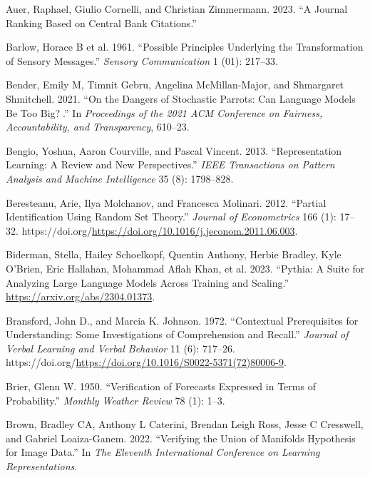 \documentclass[
]{article}
\newlength{\cslhangindent}
\newenvironment{CSLReferences}[2] %
 {\begin{list}{}{%
  \setlength{\itemindent}{0pt}
  \setlength{\leftmargin}{0pt}
  \setlength{\parsep}{0pt}
  \ifodd #1
   \setlength{\leftmargin}{\cslhangindent}
   \setlength{\itemindent}{-1\cslhangindent}
  \fi
  \setlength{\itemsep}{#2\baselineskip}}}
 {\end{list}}
\theoremstyle{plain}
\theoremstyle{definition}
\theoremstyle{remark}
\begin{document}
\begin{CSLReferences}{1}{0}
Auer, Raphael, Giulio Cornelli, and Christian Zimmermann. 2023. {``A
Journal Ranking Based on Central Bank Citations.''}

Barlow, Horace B et al. 1961. {``Possible Principles Underlying the
Transformation of Sensory Messages.''} \emph{Sensory Communication} 1
(01): 217--33.

Bender, Emily M, Timnit Gebru, Angelina McMillan-Major, and Shmargaret
Shmitchell. 2021. {``On the Dangers of Stochastic Parrots: Can Language
Models Be Too Big?🦜.''} In \emph{Proceedings of the 2021 ACM Conference
on Fairness, Accountability, and Transparency}, 610--23.

Bengio, Yoshua, Aaron Courville, and Pascal Vincent. 2013.
{``Representation Learning: A Review and New Perspectives.''} \emph{IEEE
Transactions on Pattern Analysis and Machine Intelligence} 35 (8):
1798--828.

Beresteanu, Arie, Ilya Molchanov, and Francesca Molinari. 2012.
{``Partial Identification Using Random Set Theory.''} \emph{Journal of
Econometrics} 166 (1): 17--32.
https://doi.org/\url{https://doi.org/10.1016/j.jeconom.2011.06.003}.

Biderman, Stella, Hailey Schoelkopf, Quentin Anthony, Herbie Bradley,
Kyle O'Brien, Eric Hallahan, Mohammad Aflah Khan, et al. 2023.
{``Pythia: A Suite for Analyzing Large Language Models Across Training
and Scaling.''} \url{https://arxiv.org/abs/2304.01373}.

Bransford, John D., and Marcia K. Johnson. 1972. {``Contextual
Prerequisites for Understanding: Some Investigations of Comprehension
and Recall.''} \emph{Journal of Verbal Learning and Verbal Behavior} 11
(6): 717--26.
https://doi.org/\url{https://doi.org/10.1016/S0022-5371(72)80006-9}.

Brier, Glenn W. 1950. {``Verification of Forecasts Expressed in Terms of
Probability.''} \emph{Monthly Weather Review} 78 (1): 1--3.

Brown, Bradley CA, Anthony L Caterini, Brendan Leigh Ross, Jesse C
Cresswell, and Gabriel Loaiza-Ganem. 2022. {``Verifying the Union of
Manifolds Hypothesis for Image Data.''} In \emph{The Eleventh
International Conference on Learning Representations}.


\end{CSLReferences}
\end{document}
